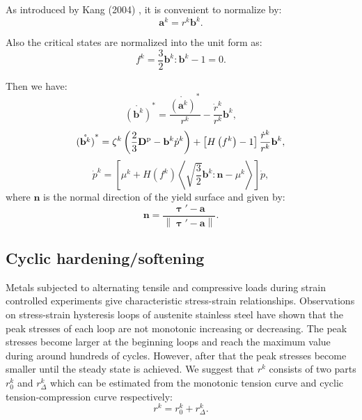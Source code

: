 As introduced by Kang (2004) \cite{kang2004visco}, it is convenient to normalize by:
\begin{equation}
\label{Equ_5:ak1}
{{\mathbf{a}}^k} = {r^k}{{\mathbf{b}}^k}.
\end{equation}

Also the critical states are normalized into the unit form as:
\begin{equation}
{f^k} = \frac{3}{2}{{\mathbf{b}}^k}:{{\mathbf{b}}^k} - 1 = 0.
\end{equation}

Then we have:
\begin{equation}
\mathring{\left({\mathbf{b}}^{k}\right)}^* = \frac{\mathring{\left({\mathbf{a}}^{k}\right)}^*}{{{r^k}}} - \frac{{{{\dot r}^k}}}{{{r^k}}}{{\mathbf{b}}^k},
\end{equation}
\begin{equation}
\mathring{\left({\mathbf{b}}^{k}\right)}^* = {\zeta ^k}\left( {\frac{2}{3}{{\mathbf{D}}^{\rm{p}}} - {{\mathbf{b}}^k}{{\dot p}^k}} \right) + \left[ {H\left( {{f^k}} \right) - 1} \right]\frac{{{{\dot r}^k}}}{{{r^k}}}{{\mathbf{b}}^k},
\end{equation}
\begin{equation}
{\dot p^k} = \left[ {{\mu ^k} + H\left( {{f^k}} \right)\left\langle {\sqrt {\frac{3}{2}} {{\mathbf{b}}^k}:{\mathbf{n}} - {\mu ^k}} \right\rangle } \right]\dot p,
\end{equation}
where ${\mathbf{n}}$ is the normal direction of the yield surface and given by:
\begin{equation}
{\mathbf{n}} = \frac{{{\bm{\uptau}'} - {\mathbf{a}}}}{{\left\| {{\bm{\uptau}}' - {\mathbf{a}}} \right\|}}.
\end{equation}

\subsection{Cyclic hardening/softening}
\noindent
Metals subjected to alternating tensile and compressive loads during strain controlled experiments give characteristic stress-strain relationships. Observations on stress-strain hysteresis loops of austenite stainless steel have shown that the peak stresses of each loop are not monotonic increasing or decreasing. The peak stresses become larger at the beginning loops and reach the maximum value during around hundreds of cycles. However, after that the peak stresses become smaller until the steady state is achieved. We suggest that $r^k$ consists of two parts $r_0^k$ and $r_{\Delta}^k$ which can be estimated from the monotonic tension curve and cyclic tension-compression curve respectively:
\begin{equation}
\label{Equ_5:rk1}
{r^k} = r_0^k + r_\Delta ^k.
\end{equation}

